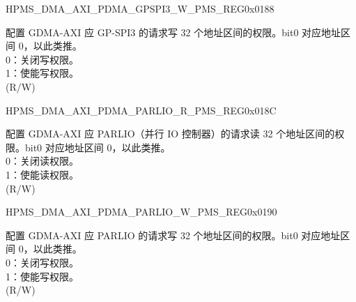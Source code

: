 \begin{register}{H}{PMS\_DMA\_AXI\_PDMA\_GPSPI3\_W\_PMS\_REG}{0x0188}\label{regdesc:PMSDMAAXIPDMAGPSPI3WPMSREG}
%
\regnewline%
\begin{regdesc}\begin{reglist}
\label{fielddesc:PMSDMAAXIPDMAGPSPI3WPMS}\item [PMS\_DMA\_AXI\_PDMA\_GPSPI3\_W\_PMS] 配置 GDMA-AXI 应 GP-SPI3 的请求写 32 个地址区间的权限。bit0 对应地址区间 0，以此类推。\\
0：关闭写权限。\\
1：使能写权限。\\ (R/W)
\end{reglist}\end{regdesc}
\end{register}


\begin{register}{H}{PMS\_DMA\_AXI\_PDMA\_PARLIO\_R\_PMS\_REG}{0x018C}\label{regdesc:PMSDMAAXIPDMAPARLIORPMSREG}
%
\regnewline%
\begin{regdesc}\begin{reglist}
\label{fielddesc:PMSDMAAXIPDMAPARLIORPMS}\item [PMS\_DMA\_AXI\_PDMA\_PARLIO\_R\_PMS] 配置 GDMA-AXI 应 PARLIO（并行 IO 控制器）的请求读 32 个地址区间的权限。bit0 对应地址区间 0，以此类推。\\
0：关闭读权限。\\
1：使能读权限。\\ (R/W)
\end{reglist}\end{regdesc}
\end{register}


\begin{register}{H}{PMS\_DMA\_AXI\_PDMA\_PARLIO\_W\_PMS\_REG}{0x0190}\label{regdesc:PMSDMAAXIPDMAPARLIOWPMSREG}
%
\regnewline%
\begin{regdesc}\begin{reglist}
\label{fielddesc:PMSDMAAXIPDMAPARLIOWPMS}\item [PMS\_DMA\_AXI\_PDMA\_PARLIO\_W\_PMS] 配置 GDMA-AXI 应 PARLIO 的请求写 32 个地址区间的权限。bit0 对应地址区间 0，以此类推。\\
0：关闭写权限。\\
1：使能写权限。\\ (R/W)
\end{reglist}\end{regdesc}
\end{register}


